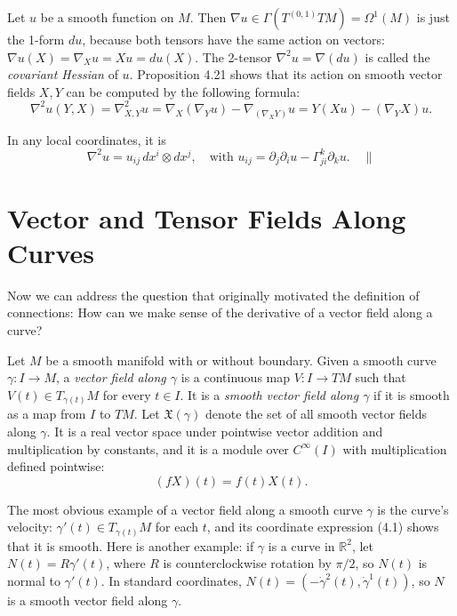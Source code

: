 \begin{example}
\label{ex:covariant-hessian}
\leanok
Let $u$ be a smooth function on $M$. Then $\nabla u \in \Gamma(T^{(0,1)}TM) = \Omega^1(M)$ is just the 1-form $du$, because both tensors have the same action on vectors: $\nabla u(X) = \nabla_X u = Xu = du(X)$. The 2-tensor $\nabla^2 u = \nabla(du)$ is called the \emph{covariant Hessian} of $u$. Proposition 4.21 shows that its action on smooth vector fields $X, Y$ can be computed by the following formula:
\[
\nabla^2 u(Y,X) = \nabla^2_{X,Y}u = \nabla_X(\nabla_Y u) - \nabla_{(\nabla_X Y)}u = Y(Xu) - (\nabla_Y X)u.
\]

In any local coordinates, it is
\[
\nabla^2 u = u_{ij}\, dx^i \otimes dx^j, \quad \text{with } u_{ij} = \partial_j \partial_i u - \Gamma^k_{ji} \partial_k u. \quad \parallel
\]
\end{example}

\section{Vector and Tensor Fields Along Curves}

Now we can address the question that originally motivated the definition of connections: How can we make sense of the derivative of a vector field along a curve?

Let $M$ be a smooth manifold with or without boundary. Given a smooth curve $\gamma: I \to M$, a \emph{vector field along $\gamma$} is a continuous map $V: I \to TM$ such that $V(t) \in T_{\gamma(t)}M$ for every $t \in I$. It is a \emph{smooth vector field along $\gamma$} if it is smooth as a map from $I$ to $TM$. Let $\mathfrak{X}(\gamma)$ denote the set of all smooth vector fields along $\gamma$. It is a real vector space under pointwise vector addition and multiplication by constants, and it is a module over $C^\infty(I)$ with multiplication defined pointwise:
\[
(fX)(t) = f(t)X(t).
\]

The most obvious example of a vector field along a smooth curve $\gamma$ is the curve's velocity: $\gamma'(t) \in T_{\gamma(t)}M$ for each $t$, and its coordinate expression (4.1) shows that it is smooth. Here is another example: if $\gamma$ is a curve in $\mathbb{R}^2$, let $N(t) = R\gamma'(t)$, where $R$ is counterclockwise rotation by $\pi/2$, so $N(t)$ is normal to $\gamma'(t)$. In standard coordinates, $N(t) = (-\dot{\gamma}^2(t), \dot{\gamma}^1(t))$, so $N$ is a smooth vector field along $\gamma$.

